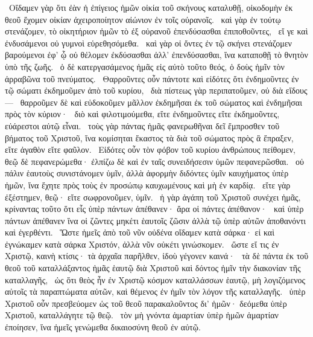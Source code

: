 ~Οἴδαμεν γὰρ ὅτι ἐὰν ἡ ἐπίγειος ἡμῶν οἰκία τοῦ σκήνους καταλυθῇ, οἰκοδομὴν ἐκ θεοῦ ἔχομεν οἰκίαν ἀχειροποίητον αἰώνιον ἐν τοῖς οὐρανοῖς.
~καὶ γὰρ ἐν τούτῳ στενάζομεν, τὸ οἰκητήριον ἡμῶν τὸ ἐξ οὐρανοῦ ἐπενδύσασθαι ἐπιποθοῦντες,
~εἴ γε καὶ ἐνδυσάμενοι οὐ γυμνοὶ εὑρεθησόμεθα.
~καὶ γὰρ οἱ ὄντες ἐν τῷ σκήνει στενάζομεν βαρούμενοι ἐφ’ ᾧ οὐ θέλομεν ἐκδύσασθαι ἀλλ’ ἐπενδύσασθαι, ἵνα καταποθῇ τὸ θνητὸν ὑπὸ τῆς ζωῆς.
~ὁ δὲ κατεργασάμενος ἡμᾶς εἰς αὐτὸ τοῦτο θεός, ὁ δοὺς ἡμῖν τὸν ἀρραβῶνα τοῦ πνεύματος.
~Θαρροῦντες οὖν πάντοτε καὶ εἰδότες ὅτι ἐνδημοῦντες ἐν τῷ σώματι ἐκδημοῦμεν ἀπὸ τοῦ κυρίου,
~διὰ πίστεως γὰρ περιπατοῦμεν, οὐ διὰ εἴδους—
~θαρροῦμεν δὲ καὶ εὐδοκοῦμεν μᾶλλον ἐκδημῆσαι ἐκ τοῦ σώματος καὶ ἐνδημῆσαι πρὸς τὸν κύριον·
~διὸ καὶ φιλοτιμούμεθα, εἴτε ἐνδημοῦντες εἴτε ἐκδημοῦντες, εὐάρεστοι αὐτῷ εἶναι.
~τοὺς γὰρ πάντας ἡμᾶς φανερωθῆναι δεῖ ἔμπροσθεν τοῦ βήματος τοῦ Χριστοῦ, ἵνα κομίσηται ἕκαστος τὰ διὰ τοῦ σώματος πρὸς ἃ ἔπραξεν, εἴτε ἀγαθὸν εἴτε φαῦλον.
~Εἰδότες οὖν τὸν φόβον τοῦ κυρίου ἀνθρώπους πείθομεν, θεῷ δὲ πεφανερώμεθα· ἐλπίζω δὲ καὶ ἐν ταῖς συνειδήσεσιν ὑμῶν πεφανερῶσθαι.
~οὐ πάλιν ἑαυτοὺς συνιστάνομεν ὑμῖν, ἀλλὰ ἀφορμὴν διδόντες ὑμῖν καυχήματος ὑπὲρ ἡμῶν, ἵνα ἔχητε πρὸς τοὺς ἐν προσώπῳ καυχωμένους καὶ μὴ ἐν καρδίᾳ.
~εἴτε γὰρ ἐξέστημεν, θεῷ· εἴτε σωφρονοῦμεν, ὑμῖν.
~ἡ γὰρ ἀγάπη τοῦ Χριστοῦ συνέχει ἡμᾶς, κρίναντας τοῦτο ὅτι εἷς ὑπὲρ πάντων ἀπέθανεν· ἄρα οἱ πάντες ἀπέθανον·
~καὶ ὑπὲρ πάντων ἀπέθανεν ἵνα οἱ ζῶντες μηκέτι ἑαυτοῖς ζῶσιν ἀλλὰ τῷ ὑπὲρ αὐτῶν ἀποθανόντι καὶ ἐγερθέντι.
~Ὥστε ἡμεῖς ἀπὸ τοῦ νῦν οὐδένα οἴδαμεν κατὰ σάρκα· εἰ καὶ ἐγνώκαμεν κατὰ σάρκα Χριστόν, ἀλλὰ νῦν οὐκέτι γινώσκομεν.
~ὥστε εἴ τις ἐν Χριστῷ, καινὴ κτίσις· τὰ ἀρχαῖα παρῆλθεν, ἰδοὺ γέγονεν καινά·
~τὰ δὲ πάντα ἐκ τοῦ θεοῦ τοῦ καταλλάξαντος ἡμᾶς ἑαυτῷ διὰ Χριστοῦ καὶ δόντος ἡμῖν τὴν διακονίαν τῆς καταλλαγῆς,
~ὡς ὅτι θεὸς ἦν ἐν Χριστῷ κόσμον καταλλάσσων ἑαυτῷ, μὴ λογιζόμενος αὐτοῖς τὰ παραπτώματα αὐτῶν, καὶ θέμενος ἐν ἡμῖν τὸν λόγον τῆς καταλλαγῆς.
~ὑπὲρ Χριστοῦ οὖν πρεσβεύομεν ὡς τοῦ θεοῦ παρακαλοῦντος δι’ ἡμῶν· δεόμεθα ὑπὲρ Χριστοῦ, καταλλάγητε τῷ θεῷ.
~τὸν μὴ γνόντα ἁμαρτίαν ὑπὲρ ἡμῶν ἁμαρτίαν ἐποίησεν, ἵνα ἡμεῖς γενώμεθα δικαιοσύνη θεοῦ ἐν αὐτῷ.

